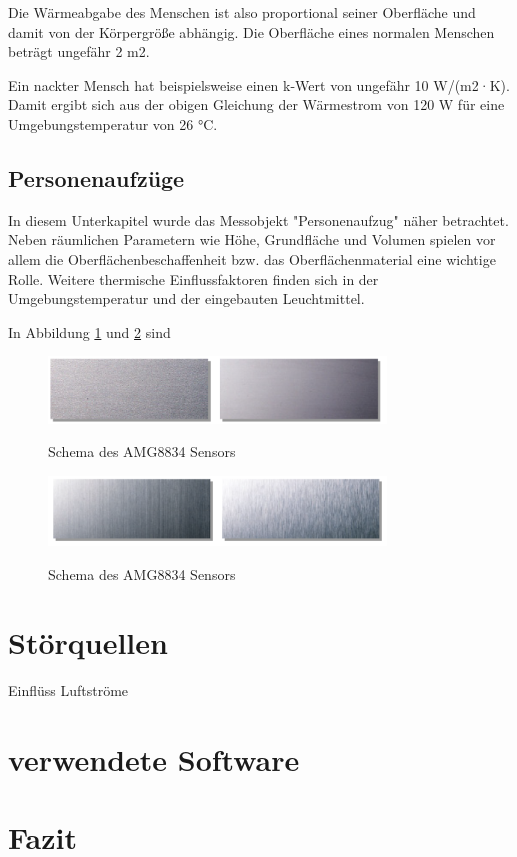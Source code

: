 Die
Wärmeabgabe des Menschen ist also proportional seiner Oberfläche und damit von der Körpergröße abhängig. Die Oberfläche eines normalen Menschen beträgt ungefähr 2 m2.

Ein nackter Mensch hat beispielsweise einen k-Wert von
ungefähr 10 W/(m2·K). Damit ergibt sich aus der obigen Gleichung der Wärmestrom von 120
W für eine Umgebungstemperatur von 26 °C. \cite{MenschWaerme}

\subsection{Personenaufzüge}

In diesem Unterkapitel wurde das Messobjekt "Personenaufzug" näher betrachtet. Neben räumlichen Parametern wie Höhe, Grundfläche und Volumen spielen vor allem die Oberflächenbeschaffenheit bzw. das Oberflächenmaterial eine wichtige Rolle. Weitere thermische Einflussfaktoren finden sich in der Umgebungstemperatur und der eingebauten Leuchtmittel.



In Abbildung \ref{fig:Edelstahlgewalzt} und \ref{fig:Edelstahlmatt} sind 
\begin{figure}[H]
	\centering
	\includegraphics[width=0.8\textwidth]
	{fig/Edelstahl_gewalzt.PNG}
	\caption[Schema des AMG8834 Sensors]{Schema des AMG8834 Sensors} \protect\cite{Edelstahl}
	\label{fig:Edelstahlgewalzt}
\end{figure}


\begin{figure}[H]
	\centering
	\includegraphics[width=0.8\textwidth]
	{fig/Edelstahl_matt.PNG}
	\caption[Schema des AMG8834 Sensors]{Schema des AMG8834 Sensors} \protect\cite{Edelstahl}
	\label{fig:Edelstahlmatt}
	
	
\end{figure}

\section{Störquellen}

Einflüss Luftströme





\section{verwendete Software}



\section{Fazit}

